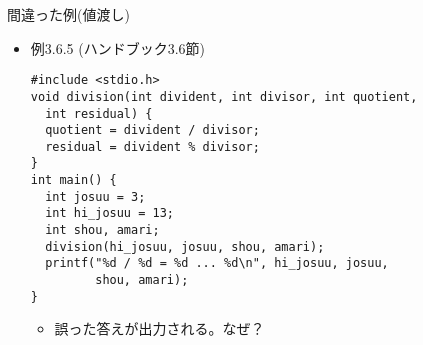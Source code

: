 \begin{frame}[t,fragile]{間違った例(値渡し)}
  \begin{itemize}
    \setlength{\itemsep}{1em}
  \item 例3.6.5 (ハンドブック3.6節)
\begin{lstlisting}
#include <stdio.h>
void division(int divident, int divisor, int quotient,
  int residual) {
  quotient = divident / divisor;
  residual = divident % divisor;
}
int main() {
  int josuu = 3;
  int hi_josuu = 13;
  int shou, amari;
  division(hi_josuu, josuu, shou, amari);
  printf("%d / %d = %d ... %d\n", hi_josuu, josuu,
         shou, amari);
}
\end{lstlisting}
\begin{itemize}
\item 誤った答えが出力される。なぜ？
\end{itemize}
  \end{itemize}
\end{frame}
